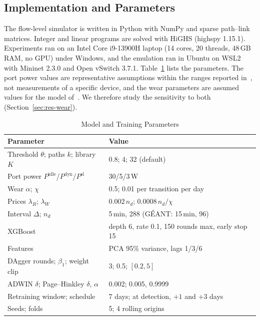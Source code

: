 \documentclass[journal]{IEEEtran}
\begin{document}
\subsection{Implementation and Parameters}\label{sec:params}

The flow-level simulator is written in Python with NumPy and sparse path--link matrices. Integer and linear programs are solved with HiGHS (highspy 1.15.1). Experiments ran on an Intel Core i9-13900H laptop (14 cores, 20 threads, 48\,GB RAM, no GPU) under Windows, and the emulation ran in Ubuntu on WSL2 with Mininet 2.3.0 and Open vSwitch 3.7.1. Table~\ref{tab:params} lists the parameters. The port power values are representative assumptions within the ranges reported in~\cite{vishwanath2014modeling,mahadevan2009power}, not measurements of a specific device, and the wear parameters are assumed values for the model of~\cite{chiaraviglio2015lifetime}. We therefore study the sensitivity to both (Section~\ref{sec:res-wear}).

\begin{table}[t]
\centering
\caption{Model and Training Parameters}
\label{tab:params}
\footnotesize
\setlength{\tabcolsep}{3pt}
\begin{tabular}{@{}p{3.9cm}p{4.6cm}@{}}
\toprule
Parameter & Value \\
\midrule
Threshold $\theta$; paths $k$; library $K$ & 0.8; 4; 32 (default) \\
Port power $P^{\mathrm{idle}}$/$P^{\mathrm{dyn}}$/$P^{\mathrm{sl}}$ & 30/5/3\,W \\
Wear $\alpha$; $\chi$ & 0.5; 0.01 per transition per day \\
Prices $\lambda_R$; $\lambda_W$ & $0.002\,n_d$; $0.0008\,n_d/\chi$ \\
Interval $\Delta$; $n_d$ & 5\,min, 288 (G\'{E}ANT: 15\,min, 96) \\
XGBoost & depth 6, rate 0.1, 150 rounds max, early stop 15 \\
Features & PCA 95\% variance, lags 1/3/6 \\
DAgger rounds; $\beta_1$; weight clip & 3; 0.5; $[0.2,5]$ \\
ADWIN $\delta$; Page--Hinkley $\delta$, $\alpha$ & 0.002; 0.005, 0.9999 \\
Retraining window; schedule & 7 days; at detection, $+1$ and $+3$ days \\
Seeds; folds & 5; 4 rolling origins \\
\bottomrule
\end{tabular}
\end{table}
\end{document}
